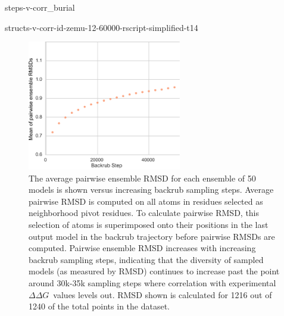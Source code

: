 \documentclass[journal=jpcbfk,manuscript=suppinfo]{achemso}
\newcommand\ddg{$\Delta\Delta G$}
\begin{document}
  {\small
    {steps-v-corr_burial}
  }
\clearpage


{structs-v-corr-id-zemu-12-60000-rscript-simplified-t14}

\begin{figure}
  \centering
  \includegraphics[width=0.6\textwidth,keepaspectratio]{figures/t14-mean-ensemble-error-50k.png}
  \caption{
    The average pairwise ensemble RMSD for each ensemble of 50 models is shown versus increasing backrub sampling steps.
    Average pairwise RMSD is computed on all atoms in residues selected as neighborhood pivot residues.
    To calculate pairwise RMSD, this selection of atoms is superimposed onto their positions in the last output model in the backrub trajectory before pairwise RMSDs are computed.
    Pairwise ensemble RMSD increases with increasing backrub sampling steps, indicating that the diversity of sampled models (as measured by RMSD) continues to increase past the point around 30k-35k sampling steps where correlation with experimental \ddg\ values levels out.
    RMSD shown is calculated for 1216 out of 1240 of the total points in the dataset.
  } \label{fig:t14-mean-ensemble} %
\end{figure}

\end{document}
